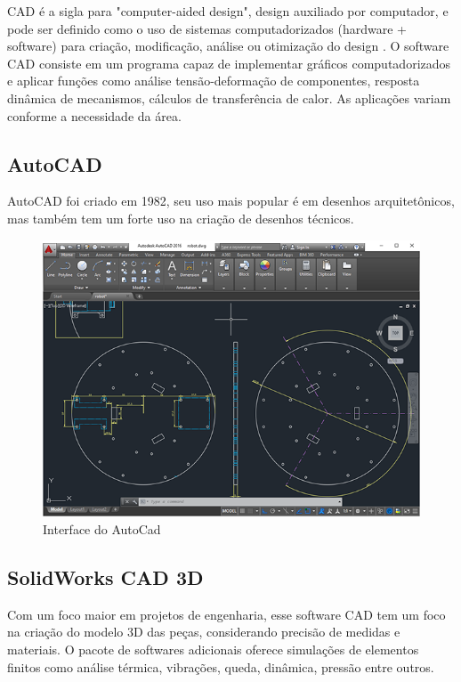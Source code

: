 CAD é a sigla para "computer-aided design", design auxiliado por computador, e pode ser definido como o uso de sistemas computadorizados (hardware + software)
para criação, modificação, análise ou otimização do design \cite{computer_aided_esign}.
O software CAD consiste em um programa capaz de implementar gráficos computadorizados e aplicar funções como análise tensão-deformação de componentes, resposta dinâmica de mecanismos,
cálculos de transferência de calor. As aplicações variam conforme a necessidade da área.

\subsection{AutoCAD}
AutoCAD foi criado em 1982, seu uso mais popular é em desenhos arquitetônicos, mas também tem um forte uso na criação de desenhos técnicos.

\begin{figure}[h]
	\centering
	\includegraphics[width=1\textwidth]{figures/autocad_screen}
	\caption{Interface do AutoCad}
	\label{fig:interface_autocad}
\end{figure}

\subsection{SolidWorks CAD 3D}
Com um foco maior em projetos de engenharia, esse software CAD tem um foco na criação do modelo 3D das peças, considerando precisão de medidas e materiais.
O pacote de softwares adicionais oferece simulações de elementos finitos como análise térmica, vibrações, queda, dinâmica, pressão entre outros.

